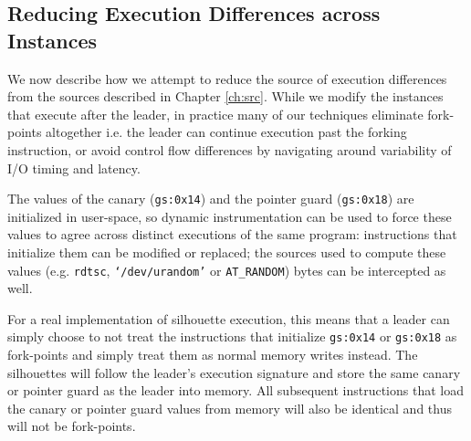 \subsection{Reducing Execution Differences across Instances}
We now describe how we attempt to reduce
the source of execution differences from the sources described in Chapter \ref{ch:src}.
While we modify
the instances that execute after the leader, 
in practice many of our techniques eliminate fork-points altogether 
i.e. the leader can continue execution past
the forking instruction,
or avoid control flow differences by navigating
around variability of I/O timing and latency. \newline


 \newline
The values of the canary (\texttt{gs:0x14}) and the pointer guard (\texttt{gs:0x18})
are initialized in user-space, so dynamic instrumentation can be used to force 
these values to agree across distinct executions of the same program:
instructions that initialize them can be
modified or replaced; the sources used to compute
these values (e.g. \texttt{rdtsc}, \texttt{`/dev/urandom'}
or \texttt{AT\_RANDOM}) bytes
can be intercepted as well.

For a real implementation of silhouette execution, this means that a leader can simply choose to
not treat the instructions that initialize \texttt{gs:0x14} or
\texttt{gs:0x18} as fork-points and simply
treat them as normal memory writes instead. The silhouettes will follow the 
leader's execution signature and store the same canary or pointer guard
as the leader into memory. All subsequent instructions
that load the canary or pointer guard values 
from memory will also be identical and thus
will not be fork-points. 
\newline

